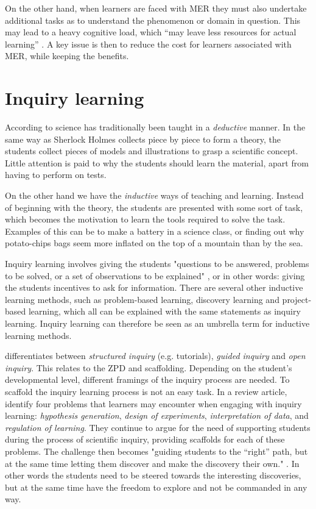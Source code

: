 On the other hand, when learners are faced with MER they must also undertake additional tasks as to understand the phenomenon or domain in question. This may lead to a heavy cognitive load, which “may leave less resources for actual learning” \citetext{Sweller, 1988, 1989, referenced in \citealp{van2006supporting}}. A key issue is then to reduce the cost for learners associated with MER, while keeping the benefits. 

\section{Inquiry learning}
According to \citet{prince2006inductive} science has traditionally been taught in a \textit{deductive} manner. In the same way as Sherlock Holmes collects piece by piece to form a theory, the students collect pieces of models and illustrations to grasp a scientific concept. Little attention is paid to why the students should learn the material, apart from having to perform on tests.

On the other hand we have the \textit{inductive} ways of teaching and learning. Instead of beginning with the theory, the students are presented with some sort of task, which becomes the motivation to learn the tools required to solve the task. Examples of this can be to make a battery in a science class, or finding out why potato-chips bags seem more inflated on the top of a mountain than by the sea.

Inquiry learning involves giving the students "questions to be answered, problems to be solved, or a set of observations to be explained" \citep{prince2006inductive}, or in other words: giving the students incentives to ask for information. There are several other inductive learning methods, such as problem-based learning, discovery learning and project-based learning, which all can be explained with the same statements as inquiry learning. Inquiry learning can therefore be seen as an umbrella term for inductive learning methods. \citep{prince2006inductive}

\citeauthor*{staver1987analysis} \citetext{\citeyear{staver1987analysis}, referenced in \citealp{prince2006inductive}} differentiates between \emph{structured inquiry} (e.g. tutorials), \emph{guided inquiry} and \emph{open inquiry}. This relates to the ZPD and scaffolding. Depending on the student's developmental level, different framings of the inquiry process are needed. To scaffold the inquiry learning process is not an easy task. In a review article, \citet{de1998scientific} identify four problems that learners may encounter when engaging with inquiry learning: \textit{hypothesis generation}, \textit{design of experiments}, \textit{interpretation of data}, and \textit{regulation of learning}. They continue to argue for the need of supporting students during the process of scientific inquiry, providing scaffolds for each of these problems. The challenge then becomes "guiding students to the “right” path, but at the
same time letting them discover and make the discovery their own." \citep[p. 247]{kluge2010simulation}. In other words the students need to be steered towards the interesting discoveries, but at the same time have the freedom to explore and not be commanded in any way.

